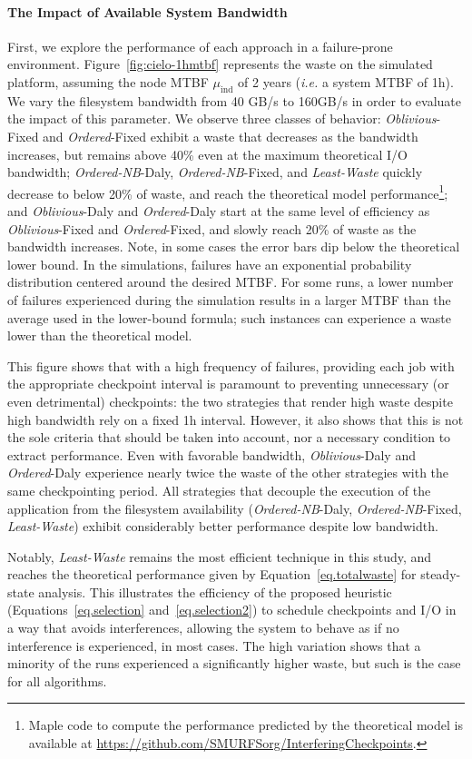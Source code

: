 \documentclass[conference,nofonttune]{IEEEtran}
\newcommand{\ie}[0]{\emph{i.e.}\xspace}
\newcommand{\muind}{\mu_{\text{ind}}}
\newcommand{\nocoop}{\emph{Oblivious}\xspace}
\newcommand{\fifoblock}{\emph{Ordered}\xspace}
\newcommand{\fifononblock}{\emph{Ordered-NB}\xspace}
\newcommand{\leastwaste}{\emph{Least-Waste}\xspace}
\def\propfixed{\nocoop-Fixed\xspace}
\def\propdaly{\nocoop-Daly\xspace}
\def\bfifofixed{\fifoblock-Fixed\xspace}
\def\bfifodaly{\fifoblock-Daly\xspace}
\def\fifofixed{\fifononblock-Fixed\xspace}
\def\fifodaly{\fifononblock-Daly\xspace}
\def\cooperative{\leastwaste}
\begin{document}
\paragraph{The Impact of Available System Bandwidth}
First, we explore the performance of each approach in a failure-prone
environment. Figure~\ref{fig:cielo-1hmtbf} represents the waste
on the simulated platform, assuming the node MTBF $\muind$ of 2 years (\ie a system
MTBF of 1h). We vary the filesystem bandwidth from 40 GB/s to 160GB/s
in order to evaluate the impact of this parameter. We observe three
classes of behavior: \propfixed and \bfifofixed exhibit a waste
that decreases as the bandwidth increases, but remains above 40\% even
at the maximum theoretical I/O bandwidth; \fifodaly, \fifofixed, and
\cooperative quickly decrease to below 20\% of waste, and reach
the theoretical model performance\footnote{Maple code to compute the
  performance predicted by the theoretical model is available at
  \url{https://github.com/SMURFSorg/InterferingCheckpoints}.};
%
and \propdaly and \bfifodaly start at the same level of efficiency as
\propfixed and \bfifofixed, and slowly reach 20\% of waste as the bandwidth
increases.
%
Note, in some cases the error bars dip below the theoretical
lower bound. In the simulations, failures have an exponential probability
distribution centered around the desired MTBF. For some runs, a lower
number of failures experienced during the simulation results in a larger
MTBF than the average used in the lower-bound formula; such instances
can experience a waste lower than the theoretical model.

This figure shows that with a high frequency of failures, providing each job
with the appropriate checkpoint interval is paramount to preventing unnecessary
(or even detrimental) checkpoints: the two strategies that render high waste
despite high bandwidth rely on a fixed 1h interval. However, it also shows that
this is not the sole criteria that should be taken into account, nor a
necessary condition to extract performance. Even with favorable bandwidth,
\propdaly and \bfifodaly experience nearly twice the waste of the other
strategies with the same checkpointing period. All strategies that decouple the
execution of the application from the filesystem availability (\fifodaly,
\fifofixed, \cooperative) exhibit considerably better performance despite low
bandwidth.

Notably, \cooperative remains the most efficient technique in this study, and
reaches the theoretical performance given by Equation~\eqref{eq.totalwaste} for
steady-state analysis. This illustrates the efficiency of the proposed
heuristic (Equations~\eqref{eq.selection} and~\eqref{eq.selection2}) to
schedule checkpoints and I/O in a way that avoids interferences, allowing the
system to behave as if no interference is experienced, in most cases. The high
variation shows that a minority of the runs experienced a significantly higher
waste, but such is the case for all algorithms.
\end{document}
